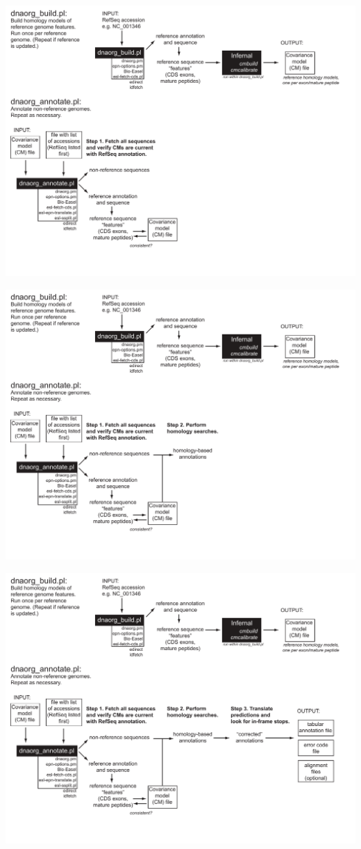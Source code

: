 \documentclass[landscape]{slides}
\begin{document}
\begin{slide}
\includegraphics[width=10in]{figs/dnaorg-scripts-annotate2}
\vfill
\end{slide}
\begin{slide}
\includegraphics[width=10in]{figs/dnaorg-scripts-annotate3}
\vfill
\end{slide}
\begin{slide}
\includegraphics[width=10in]{figs/dnaorg-scripts-annotate4}
\vfill
\end{slide}
\end{document}
